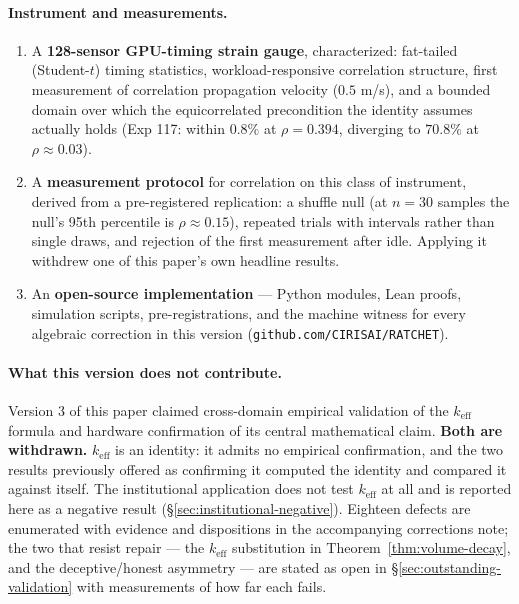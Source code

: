 \documentclass[11pt,a4paper]{article}
\theoremstyle{definition}
\theoremstyle{remark}
\newcommand{\keff}{k_{\text{eff}}}
\begin{document}
\paragraph{Instrument and measurements.}
\begin{enumerate}[resume]
    \item A \textbf{128-sensor GPU-timing strain gauge}, characterized: fat-tailed (Student-$t$) timing statistics, workload-responsive correlation structure, first measurement of correlation propagation velocity ($0.5$ m/s), and a bounded domain over which the equicorrelated precondition the identity assumes actually holds (Exp 117: within $0.8\%$ at $\rho = 0.394$, diverging to $70.8\%$ at $\rho \approx 0.03$).

    \item A \textbf{measurement protocol} for correlation on this class of instrument, derived from a pre-registered replication: a shuffle null (at $n = 30$ samples the null's 95th percentile is $\rho \approx 0.15$), repeated trials with intervals rather than single draws, and rejection of the first measurement after idle. Applying it withdrew one of this paper's own headline results.

    \item An \textbf{open-source implementation} --- Python modules, Lean proofs, simulation scripts, pre-registrations, and the machine witness for every algebraic correction in this version (\texttt{github.com/CIRISAI/RATCHET}).
\end{enumerate}

\paragraph{What this version does not contribute.}
Version 3 of this paper claimed cross-domain empirical validation of the $\keff$ formula and hardware confirmation of its central mathematical claim. \textbf{Both are withdrawn.} $\keff$ is an identity: it admits no empirical confirmation, and the two results previously offered as confirming it computed the identity and compared it against itself. The institutional application does not test $\keff$ at all and is reported here as a negative result (\S\ref{sec:institutional-negative}). Eighteen defects are enumerated with evidence and dispositions in the accompanying corrections note; the two that resist repair --- the $\keff$ substitution in Theorem~\ref{thm:volume-decay}, and the deceptive/honest asymmetry --- are stated as open in \S\ref{sec:outstanding-validation} with measurements of how far each fails.
\end{document}
